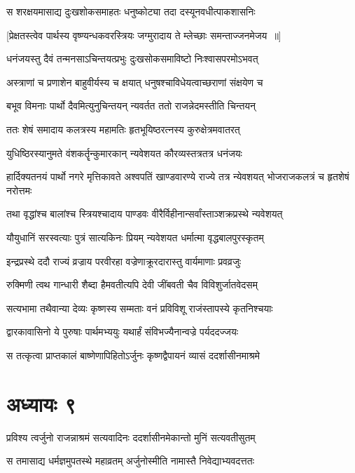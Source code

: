 \twolineshloka
{स शरक्षयमासाद्य दुःखशोकसमाहतः}
{धनुष्कोट्या तदा दस्यूनवधीत्पाकशासनिः}


\twolineshloka
{[प्रेक्षतस्त्वेव पार्थस्य वृष्ण्यन्धकवरस्त्रियः}
{जग्मुरादाय ते म्लेच्छाः समन्ताज्जनमेजय ॥]}


\twolineshloka
{धनंजयस्तु दैवं तन्मनसाऽचिन्तयत्प्रभुः}
{दुःखसोकसमाविष्टो निःश्वासपरमोऽभवत्}


\twolineshloka
{अस्त्राणां च प्रणाशेन बाहुवीर्यस्य च क्षयात्}
{धनुषश्चाविधेयत्वाच्छराणां संक्षयेण च}


\twolineshloka
{बभूव विमनाः पार्थो दैवमित्युनुचिन्तयन्}
{न्यवर्तत ततो राजन्नेदमस्तीति चिन्तयन्}


\twolineshloka
{ततः शेषं समादाय कलत्रस्य महामतिः}
{हृतभूयिष्ठरत्नस्य कुरुक्षेत्रमवातरत्}


\twolineshloka
{युधिष्ठिरस्यानुमते वंशकर्तॄन्कुमारकान्}
{न्यवेशयत कौरव्यस्तत्रतत्र धनंजयः}


\threelineshloka
{हार्दिक्यतनयं पार्थो नगरे मृत्तिकावते}
{अश्वपतिं खाण्डवारण्ये राज्ये तत्र न्येवशयत्}
{भोजराजकलत्रं च हृतशेषं नरोत्तमः}


\twolineshloka
{तथा वृद्धांश्च बालांश्च स्त्रियश्चादाय पाण्डवः}
{वीरैर्विहीनान्सर्वांस्ताञ्शक्रप्रस्थे न्यवेशयत्}


\twolineshloka
{यौयुधानिं सरस्वत्याः पुत्रं सात्यकिनः प्रियम्}
{न्यवेशयत धर्मात्मा वृद्धबालपुरस्कृतम्}


\twolineshloka
{इन्द्रप्रस्थे ददौ राज्यं व्रज्राय परवीरहा}
{वज्रेणाक्रूरदारास्तु वार्यमाणाः प्रवव्रजुः}


\twolineshloka
{रुक्मिणी त्वथ गान्धारी शैब्दा हैमवतीत्यपि}
{देवी जींबवती चैव विविशुर्जातवेदसम्}


\twolineshloka
{सत्यभामा तथैवान्या देव्यः कृष्णस्य सम्मताः}
{वनं प्रविविशू राजंस्तापस्ये कृतनिश्चयाः}


\twolineshloka
{द्वारकावासिनो ये पुरुषाः पार्थमभ्ययुः}
{यथार्हं संविभज्यैनान्वज्रे पर्यददज्जयः}


\twolineshloka
{स तत्कृत्वा प्राप्तकालं बाष्णेणापिहितोऽर्जुनः}
{कृष्णद्वैपायनं व्यासं ददर्शासीनमाश्रमे}


\chapter{अध्यायः ९}
\twolineshloka
{प्रविश्य त्वर्जुनो राजन्नाश्रमं सत्यवादिनः}
{ददर्शासीनमेकान्तो मुनिं सत्यवतीसुतम्}


\twolineshloka
{स तमासाद्य धर्मज्ञमुपतस्थे महाव्रतम्}
{अर्जुनोस्मीति नामास्तै निवेद्याभ्यवदत्ततः}


